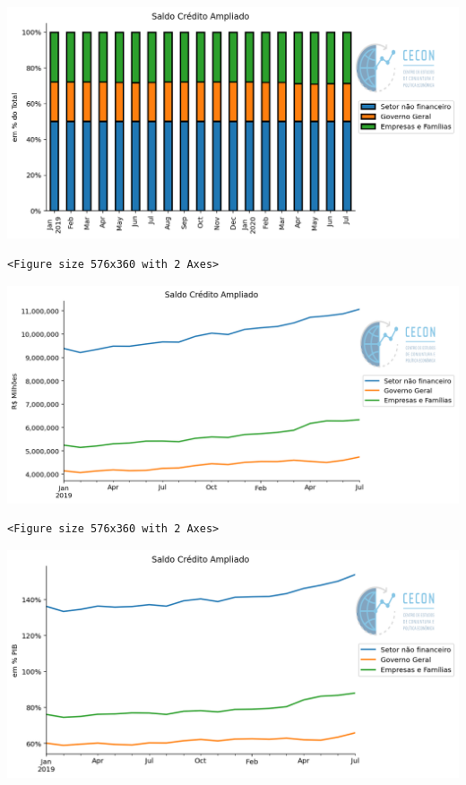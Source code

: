 \documentclass[11pt]{article}
\begin{document}
\begin{enumerate}
\begin{center}
\includegraphics[width=.9\linewidth]{obipy-resources/62e383af79e91b63c7fc98dd7fb55b3c3ececcb9/fc25f4901d8007b52b37c8cc10e4620bc37873f2.png}
\end{center}

\begin{verbatim}
<Figure size 576x360 with 2 Axes>
\end{verbatim}


\begin{center}
\includegraphics[width=.9\linewidth]{obipy-resources/62e383af79e91b63c7fc98dd7fb55b3c3ececcb9/285a93936f0519f57c3f51e4597e9bc013c3ab1a.png}
\end{center}


\begin{verbatim}
<Figure size 576x360 with 2 Axes>
\end{verbatim}


\begin{center}
\includegraphics[width=.9\linewidth]{obipy-resources/62e383af79e91b63c7fc98dd7fb55b3c3ececcb9/71e2f6f170d1eae4c7e08b6bb69381e2fc6bfa43.png}
\end{center}


\end{enumerate}
\end{document}
